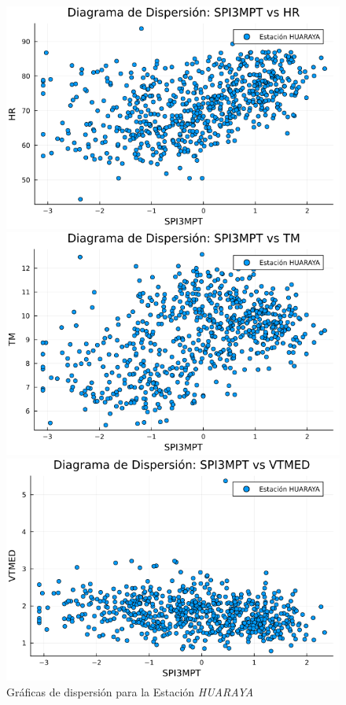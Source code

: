 \begin{figure}[htbp]
\centering
\caption{Gráficas de dispersión para la Estación \textit{HUARAYA}}
\begin{minipage}{0.32\textwidth}
    \centering
    \includegraphics[width=\linewidth]{Capitulos/Scaterplot/HUARAYA_SPI3MPT_vs_HR.png}
\end{minipage}\hfill
\begin{minipage}{0.32\textwidth}
    \centering
    \includegraphics[width=\linewidth]{Capitulos/Scaterplot/HUARAYA_SPI3MPT_vs_TM.png}
\end{minipage}\hfill
\begin{minipage}{0.32\textwidth}
    \centering
    \includegraphics[width=\linewidth]{Capitulos/Scaterplot/HUARAYA_SPI3MPT_vs_VTMED.png}

\end{minipage}
\end{figure}
